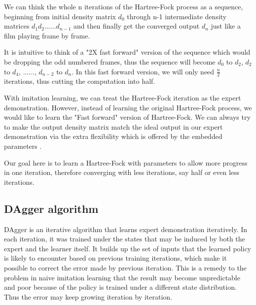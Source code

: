 \documentclass[twoside]{article}
\begin{document}
We can think the whole n iterations of the Hartree-Fock process as a sequence, beginning from initial density matrix $d_0$ through n-1 intermediate density matrices $d_1 d_2 ...... d_{n-1}$ and then finally get the converged output $d_{n}$ just like a film playing frame by frame. 

It is intuitive to think of a "2X fast forward" version of the sequence which would be dropping the odd numbered frames, thus the sequence will become $d_0$ to $d_2$, $d_2$ to $d_4$, ......, $d_{n-2}$ to $d_n$. In this fast forward version, we will only need $\frac{n}{2}$ iterations, thus cutting the computation into half.

With imitation learning,
we can treat the Hartree-Fock iteration as the expert demonstration. However, instead of learning the original Hartree-Fock process, we would like to learn the "Fast forward" version of Hartree-Fock. We can always try to make the output density matrix match the ideal output in our expert demonstration via the extra flexibility which is offered by the embedded parameters .


Our goal here is to learn a Hartree-Fock with parameters to allow more progress in one iteration, therefore converging with less iterations, say half or even less iterations.  








\subsection{DAgger algorithm}
DAgger is an iterative algorithm that learns expert demonstration iteratively. In each iteration, it was trained under the states that may be induced by both the expert and the learner itself. It builds up the set of inputs that the learned policy is likely to encounter based on previous training iterations, which make it possible to correct the error made by previous iteration. This is a remedy to the problem in naive imitation learning that the result may become unpredictable and poor because of the policy is trained under a different state distribution. Thus the error may keep growing iteration by iteration.
\end{document}
